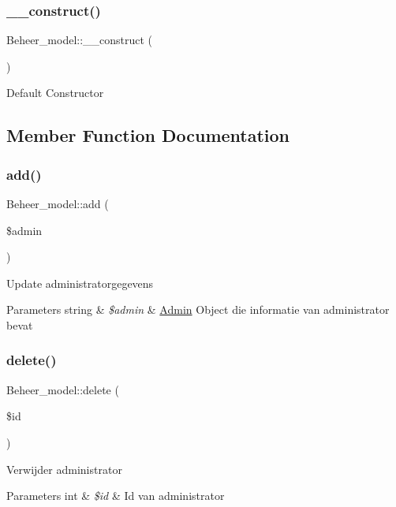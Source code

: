 \subsubsection{\texorpdfstring{\+\_\+\+\_\+construct()}{\_\_construct()}}
{\footnotesize\ttfamily Beheer\+\_\+model\+::\+\_\+\+\_\+construct (\begin{DoxyParamCaption}{ }\end{DoxyParamCaption})}

Default Constructor 

\subsection{Member Function Documentation}
\mbox{\label{class_beheer__model_ab2055875ff468d37e24df6f110133f9d}} 
\subsubsection{\texorpdfstring{add()}{add()}}
{\footnotesize\ttfamily Beheer\+\_\+model\+::add (\begin{DoxyParamCaption}\item[{}]{\$admin }\end{DoxyParamCaption})}

Update administratorgegevens 
\begin{DoxyParams}[1]{Parameters}
string & {\em \$admin} & \mbox{\hyperlink{class_admin}{Admin}} Object die informatie van administrator bevat \\
\hline
\end{DoxyParams}
\mbox{\label{class_beheer__model_aac6bca6190704021f57f1a3098524ed6}} 
\subsubsection{\texorpdfstring{delete()}{delete()}}
{\footnotesize\ttfamily Beheer\+\_\+model\+::delete (\begin{DoxyParamCaption}\item[{}]{\$id }\end{DoxyParamCaption})}

Verwijder administrator 
\begin{DoxyParams}[1]{Parameters}
int & {\em \$id} & Id van administrator \\
\hline
\end{DoxyParams}
\mbox{\label{class_beheer__model_aea3ea2a1c2a1f62d945524f87fa9ff39}} 
